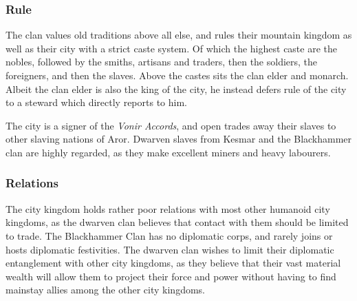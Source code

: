 \subsubsection*{Rule}

The clan values old traditions above all else, and rules their mountain
kingdom as well as their city with a strict caste system. Of which the highest
caste are the nobles, followed by the smiths, artisans and traders, then the
soldiers, the foreigners, and then the slaves. Above the castes sits the clan
elder and monarch. Albeit the clan elder is also the king of the city, he
instead defers rule of the city to a steward which directly reports to him.

The city is a signer of the \emph{Vonir Accords}, and open trades away their
slaves to other slaving nations of Aror. Dwarven slaves from Kesmar and the
Blackhammer clan are highly regarded, as they make excellent miners and heavy
labourers.

\subsubsection*{Relations}

The city kingdom holds rather poor relations with most other humanoid city
kingdoms, as the dwarven clan believes that contact with them should be limited
to trade. The Blackhammer Clan has no diplomatic corps, and rarely joins or
hosts diplomatic festivities. The dwarven clan wishes to limit their diplomatic
entanglement with other city kingdoms, as they believe that their vast material
wealth will allow them to project their force and power without having to find
mainstay allies among the other city kingdoms.
